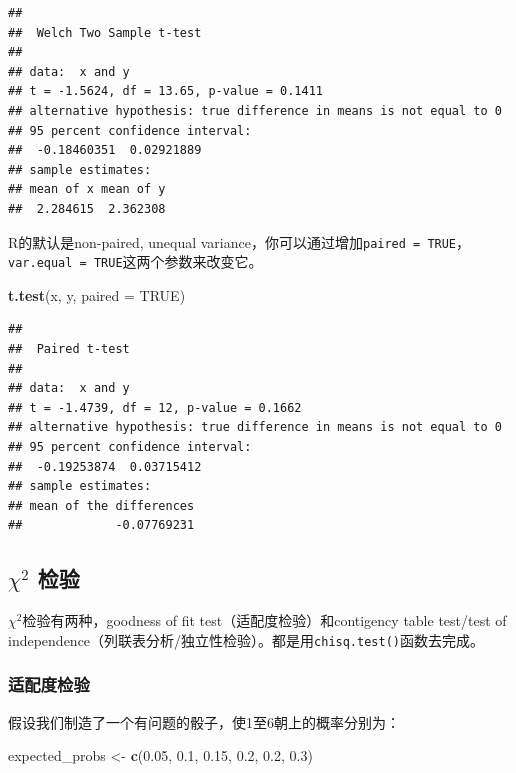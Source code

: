 \documentclass[]{book}
\newenvironment{Shaded}{\begin{snugshade}}{\end{snugshade}}
\newcommand{\DataTypeTok}[1]{\textcolor[rgb]{0.13,0.29,0.53}{#1}}
\newcommand{\FloatTok}[1]{\textcolor[rgb]{0.00,0.00,0.81}{#1}}
\newcommand{\KeywordTok}[1]{\textcolor[rgb]{0.13,0.29,0.53}{\textbf{#1}}}
\newcommand{\NormalTok}[1]{#1}
\newcommand{\OtherTok}[1]{\textcolor[rgb]{0.56,0.35,0.01}{#1}}
\newcommand{\StringTok}[1]{\textcolor[rgb]{0.31,0.60,0.02}{#1}}
\begin{document}
\begin{verbatim}
## 
##  Welch Two Sample t-test
## 
## data:  x and y
## t = -1.5624, df = 13.65, p-value = 0.1411
## alternative hypothesis: true difference in means is not equal to 0
## 95 percent confidence interval:
##  -0.18460351  0.02921889
## sample estimates:
## mean of x mean of y 
##  2.284615  2.362308
\end{verbatim}

R的默认是non-paired, unequal variance，你可以通过增加\texttt{paired\ =\ TRUE}，\texttt{var.equal\ =\ TRUE}这两个参数来改变它。

\begin{Shaded}
\begin{Highlighting}[]
\KeywordTok{t.test}\NormalTok{(x, y, }\DataTypeTok{paired =} \OtherTok{TRUE}\NormalTok{)}
\end{Highlighting}
\end{Shaded}

\begin{verbatim}
## 
##  Paired t-test
## 
## data:  x and y
## t = -1.4739, df = 12, p-value = 0.1662
## alternative hypothesis: true difference in means is not equal to 0
## 95 percent confidence interval:
##  -0.19253874  0.03715412
## sample estimates:
## mean of the differences 
##             -0.07769231
\end{verbatim}

\hypertarget{chi2-}{%
\subsection{\texorpdfstring{\(\chi^2\) 检验}{\textbackslash{}chi\^{}2 检验}}\label{chi2-}}

\(\chi^2\)检验有两种，goodness of fit test（适配度检验）和contigency table test/test of independence（列联表分析/独立性检验）。都是用\texttt{chisq.test()}函数去完成。

\subsubsection{适配度检验}

假设我们制造了一个有问题的骰子，使1至6朝上的概率分别为：

\begin{Shaded}
\begin{Highlighting}[]
\NormalTok{expected_probs <-}\StringTok{ }\KeywordTok{c}\NormalTok{(}\FloatTok{0.05}\NormalTok{, }\FloatTok{0.1}\NormalTok{, }\FloatTok{0.15}\NormalTok{, }\FloatTok{0.2}\NormalTok{, }\FloatTok{0.2}\NormalTok{, }\FloatTok{0.3}\NormalTok{)}
\end{Highlighting}
\end{Shaded}
\end{document}
